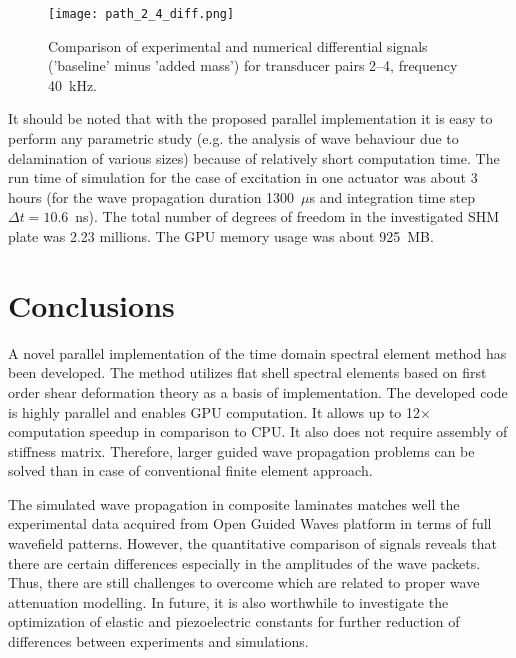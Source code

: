 \documentclass[preprint,12pt]{elsarticle}
\begin{document}
	\begin{figure} [h!]
		\centering
		\texttt{[image: path\_2\_4\_diff.png]}	
		\caption{Comparison of experimental and numerical differential signals ('baseline' minus 'added mass') for transducer pairs 2--4, frequency 40~kHz.}
		\label{fig:path2_4_diff}
	\end{figure}
	
	It should be noted that with the proposed parallel implementation it is easy to perform any parametric study (e.g. the analysis of wave behaviour due to delamination of various sizes) because of relatively short computation time. The run time of simulation for the case of excitation in one actuator was about 3 hours (for the wave propagation duration 1300~$\mu$s and integration time step $\Delta t = 10.6$~ns). The total number of degrees of freedom in the investigated SHM plate was 2.23 millions. The GPU memory usage was about 925~MB.
	
	\section{Conclusions}
	A novel parallel implementation of the time domain spectral element method has been developed. The method utilizes flat shell spectral elements based on first order shear deformation theory as a basis of implementation. The developed code is highly parallel and enables GPU computation. It allows up to 12$\times$ computation speedup in comparison to CPU. It also does not require assembly of stiffness matrix. Therefore, larger guided wave propagation problems can be solved than in case of conventional finite element approach.
	
	The simulated wave propagation in composite laminates matches well the experimental data acquired from Open Guided Waves platform in terms of full wavefield patterns. However, the quantitative comparison of signals reveals that there are certain differences especially in the amplitudes of the wave packets. Thus, there are still challenges to overcome which are related to proper wave attenuation modelling. In future, it is also worthwhile to investigate the optimization of elastic and piezoelectric constants for further reduction of differences between experiments and simulations.
	
\end{document}
